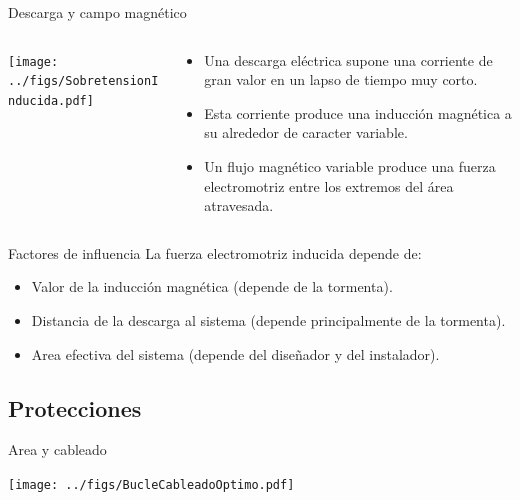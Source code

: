 \documentclass[aspectratio=169, usenames,svgnames,dvipsnames]{beamer}
\begin{document}
\begin{frame}[label={sec:orga51bc73},plain]{Descarga y campo magnético}
\begin{columns}
\begin{column}{0.4\columnwidth}
\begin{center}
\texttt{[image: ../figs/SobretensionInducida.pdf]}
\end{center}
\end{column}
\begin{column}{0.6\columnwidth}
\begin{itemize}
\item Una descarga eléctrica supone una \alert{corriente de gran valor} en un lapso de \alert{tiempo muy corto}.

\item Esta corriente produce una \alert{inducción magnética} a su alrededor de caracter \alert{variable}.

\item Un flujo magnético variable produce una \alert{fuerza electromotriz} entre los extremos del área atravesada.
\end{itemize}
\end{column}
\end{columns}
\end{frame}

\begin{frame}[label={sec:orgbc24191}]{Factores de influencia}
La fuerza electromotriz inducida depende de:

\begin{itemize}
\item \alert{Valor de la inducción magnética} (depende de la tormenta).

\item \alert{Distancia} de la descarga al sistema (depende principalmente de la
tormenta).

\item \alert{Area efectiva del sistema} (depende del diseñador y del instalador).
\end{itemize}
\end{frame}

\subsection{Protecciones}
\label{sec:org4cc72ee}


\begin{frame}[label={sec:orgc98d1ca}]{Area y cableado}
\begin{center}
\texttt{[image: ../figs/BucleCableadoOptimo.pdf]}
\end{center}
\end{frame}
\end{document}

